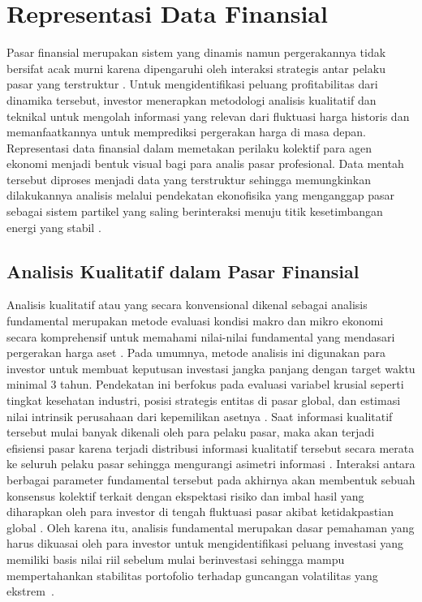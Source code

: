 \section{Representasi Data Finansial}
Pasar finansial merupakan sistem yang dinamis namun pergerakannya tidak bersifat acak murni karena dipengaruhi oleh interaksi strategis antar pelaku pasar yang terstruktur \cite{schwert_chapter_2003}. Untuk mengidentifikasi peluang profitabilitas dari dinamika tersebut, investor menerapkan metodologi analisis kualitatif dan teknikal untuk mengolah informasi yang relevan dari fluktuasi harga historis dan memanfaatkannya untuk memprediksi pergerakan harga di masa depan. Representasi data finansial dalam memetakan perilaku kolektif para agen ekonomi menjadi bentuk visual bagi para analis pasar profesional. Data mentah tersebut diproses menjadi data yang terstruktur sehingga memungkinkan dilakukannya analisis melalui pendekatan ekonofisika yang menganggap pasar sebagai sistem partikel yang saling berinteraksi menuju titik kesetimbangan energi yang stabil \cite{hidalgo_quantum_2006}.

\subsection{Analisis Kualitatif dalam Pasar Finansial}
Analisis kualitatif atau yang secara konvensional dikenal sebagai analisis fundamental merupakan metode evaluasi kondisi makro dan mikro ekonomi secara komprehensif untuk memahami nilai-nilai fundamental yang mendasari pergerakan harga aset \cite{schwert_chapter_2003}. Pada umumnya, metode analisis ini digunakan para investor untuk membuat keputusan investasi jangka panjang dengan target waktu minimal 3 tahun. Pendekatan ini berfokus pada evaluasi variabel krusial seperti tingkat kesehatan industri, posisi strategis entitas di pasar global, dan estimasi nilai intrinsik perusahaan dari kepemilikan asetnya \cite{markowitz_portfolio_1952}. Saat informasi kualitatif tersebut mulai banyak dikenali oleh para pelaku pasar, maka akan terjadi efisiensi pasar karena terjadi distribusi informasi kualitatif tersebut secara merata ke seluruh pelaku pasar sehingga mengurangi asimetri informasi \cite{schwert_chapter_2003}. Interaksi antara berbagai parameter fundamental tersebut pada akhirnya akan membentuk sebuah konsensus kolektif terkait dengan ekspektasi risiko dan imbal hasil yang diharapkan oleh para investor di tengah fluktuasi pasar akibat ketidakpastian global . Oleh karena itu, analisis fundamental merupakan dasar pemahaman yang harus dikuasai oleh para investor untuk mengidentifikasi peluang investasi yang memiliki basis nilai riil sebelum mulai berinvestasi sehingga mampu mempertahankan stabilitas portofolio terhadap guncangan volatilitas yang ekstrem~\cite{la_torre_multi-agent_2026}.

